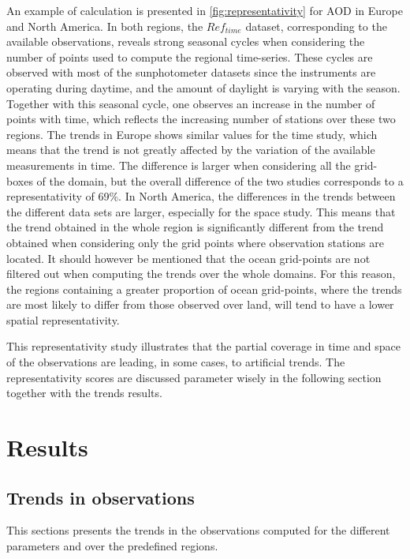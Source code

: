 \documentclass[journal abbreviation, manuscript]{copernicus}
\begin{document}
An example of calculation is presented in \ref{fig:representativity} for AOD in Europe and North America. In both regions, the $Ref_{time}$ dataset, corresponding to the available observations, reveals strong seasonal cycles when considering the number of points used to compute the regional time-series. These cycles are observed with most of the sunphotometer datasets since the instruments are operating during daytime, and the amount of daylight is varying with the season. Together with this seasonal cycle, one observes an increase in the number of points with time, which reflects the increasing number of stations over these two regions. The trends in Europe shows similar values for the time study, which means that the trend is not greatly affected by the variation of the available measurements in time. The difference is larger when considering all the grid-boxes of the domain, but the overall difference of the two studies corresponds to a representativity of 69\%. In North America, the differences in the trends between the different data sets are larger, especially for the space study. This means that the trend obtained in the whole region is significantly different from the trend obtained when considering only the grid points where observation stations are located. It should however be mentioned that the ocean grid-points are not filtered out when computing the trends over the whole domains. For this reason, the regions containing a greater proportion of ocean grid-points, where the trends are most likely to differ from those observed over land, will tend to have a lower spatial representativity.

This representativity study illustrates that the partial coverage in time and space of the observations are leading, in some cases, to artificial trends. The representativity scores are discussed parameter wisely in the following section together with the trends results.

\section{Results}

\subsection{Trends in observations}
This sections presents the trends in the observations computed for the different parameters and over the predefined regions.
\end{document}
